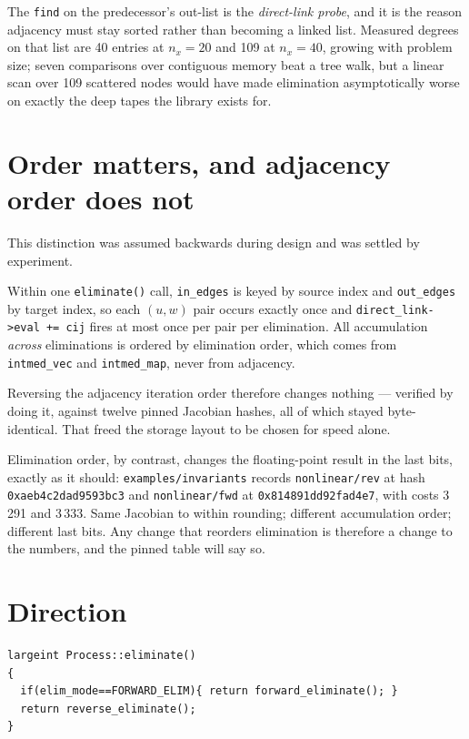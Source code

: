 \documentclass[11pt,a4paper]{report}
\newcommand{\code}[1]{\texttt{#1}}
\begin{document}
The \code{find} on the predecessor's out-list is the \emph{direct-link probe},
and it is the reason adjacency must stay sorted rather than becoming a linked
list. Measured degrees on that list are 40 entries at $n_x=20$ and 109 at
$n_x=40$, growing with problem size; seven comparisons over contiguous memory
beat a tree walk, but a linear scan over 109 scattered nodes would have made
elimination asymptotically worse on exactly the deep tapes the library exists
for.

\section{Order matters, and adjacency order does not}

This distinction was assumed backwards during design and was settled by
experiment.

Within one \code{eliminate()} call, \code{in\_edges} is keyed by source index
and \code{out\_edges} by target index, so each $(u,w)$ pair occurs exactly once
and \code{direct\_link->eval += cij} fires at most once per pair per
elimination. All accumulation \emph{across} eliminations is ordered by
elimination order, which comes from \code{intmed\_vec} and \code{intmed\_map},
never from adjacency.

Reversing the adjacency iteration order therefore changes nothing --- verified
by doing it, against twelve pinned Jacobian hashes, all of which stayed
byte-identical. That freed the storage layout to be chosen for speed alone.

Elimination order, by contrast, changes the floating-point result in the last
bits, exactly as it should: \code{examples/invariants} records
\code{nonlinear/rev} at hash \code{0xaeb4c2dad9593bc3} and \code{nonlinear/fwd}
at \code{0x814891dd92fad4e7}, with costs 3\,291 and 3\,333. Same Jacobian to
within rounding; different accumulation order; different last bits. Any change
that reorders elimination is therefore a change to the numbers, and the pinned
table will say so.

\section{Direction}

\begin{lstlisting}
largeint Process::eliminate()
{
  if(elim_mode==FORWARD_ELIM){ return forward_eliminate(); }
  return reverse_eliminate();
}
\end{lstlisting}
\end{document}
